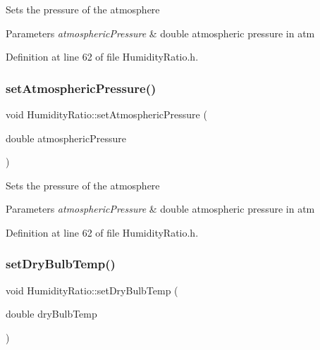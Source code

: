 Sets the pressure of the atmosphere


\begin{DoxyParams}{Parameters}
{\em atmospheric\+Pressure} & double atmospheric pressure in atm \\
\hline
\end{DoxyParams}


Definition at line 62 of file Humidity\+Ratio.\+h.

\mbox{\label{class_humidity_ratio_aebab92be0c5eb4f23baaeb7268dad87e}} 
\subsubsection{\texorpdfstring{set\+Atmospheric\+Pressure()}{setAtmosphericPressure()}\hspace{0.1cm}{\footnotesize\ttfamily [3/3]}}
{\footnotesize\ttfamily void Humidity\+Ratio\+::set\+Atmospheric\+Pressure (\begin{DoxyParamCaption}\item[{double}]{atmospheric\+Pressure }\end{DoxyParamCaption})\hspace{0.3cm}{\ttfamily [inline]}}

Sets the pressure of the atmosphere


\begin{DoxyParams}{Parameters}
{\em atmospheric\+Pressure} & double atmospheric pressure in atm \\
\hline
\end{DoxyParams}


Definition at line 62 of file Humidity\+Ratio.\+h.

\mbox{\label{class_humidity_ratio_a291bccce6b8665412987a31bd2633d9a}} 
\subsubsection{\texorpdfstring{set\+Dry\+Bulb\+Temp()}{setDryBulbTemp()}\hspace{0.1cm}{\footnotesize\ttfamily [1/3]}}
{\footnotesize\ttfamily void Humidity\+Ratio\+::set\+Dry\+Bulb\+Temp (\begin{DoxyParamCaption}\item[{double}]{dry\+Bulb\+Temp }\end{DoxyParamCaption})\hspace{0.3cm}{\ttfamily [inline]}}

